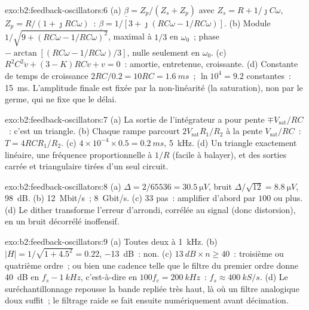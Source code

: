 \begin{solution}{exo:b2:feedback-oscillators:6}
(a) $\underline\beta = Z_p/(Z_s + Z_p)$ avec $Z_s = R + 1/\jmath C\omega$, $Z_p = R/(1 +
\jmath RC\omega)$~: $\underline\beta = 1/[3 + \jmath(RC\omega - 1/RC\omega)]$. (b) Module
$1/\sqrt{9 + (RC\omega - 1/RC\omega)^2}$, maximal à $1/3$ en $\omega_0$~; phase $-\arctan
[(RC\omega - 1/RC\omega)/3]$, nulle seulement en $\omega_0$. (c) $R^2C^2\ddot v + (3 - K)RC
\dot v + v = 0$~: amortie, entretenue, croissante. (d) Constante de temps de croissance
$2RC/0.2 = 10RC = \qty{1.6}{ms}$~; $\ln10^4 = 9.2$ constantes~: \qty{15}{ms}. L'amplitude
finale est fixée par la non-linéarité (la saturation), non par le
germe, qui ne fixe que le délai.
\end{solution}

\begin{solution}{exo:b2:feedback-oscillators:7}
(a) La sortie de l'intégrateur a pour pente $\mp V_{\text{sat}}/RC$~: c'est un triangle. (b)
Chaque rampe parcourt $2V_{\text{sat}}R_1/R_2$ à la pente $V_{\text{sat}}/RC$~: $T = 4RCR_1/R_2$.
(c) $4 \times 10^{-4} \times 0.5 = \qty{0.2}{ms}$, \qty{5}{kHz}. (d) Un triangle exactement
linéaire, une fréquence proportionnelle à $1/R$ (facile à balayer), et des sorties carrée et
triangulaire tirées d'un seul circuit.
\end{solution}

\begin{solution}{exo:b2:feedback-oscillators:8}
(a) $\Delta = 2/65536 = \qty{30.5}{\micro V}$, bruit $\Delta/\sqrt{12} = \qty{8.8}{\micro V}$,
\qty{98}{dB}. (b) \qty{12}{Mbit/s}~; \qty{8}{Gbit/s}. (c) $33$ pas~: amplifier d'abord
par $100$ ou plus. (d) Le dither transforme l'erreur d'arrondi, corrélée
au signal (donc distorsion), en un bruit décorrélé inoffensif.
\end{solution}

\begin{solution}{exo:b2:feedback-oscillators:9}
(a) Toutes deux à \qty{1}{kHz}. (b) $|H| = 1/\sqrt{1 + 4.5^2} = 0.22$, \qty{-13}{dB}~: non. (c)
$\qty{13}{dB} \times n \ge 40$~: troisième ou quatrième ordre~; ou bien une cadence telle
que le filtre du premier ordre donne \qty{40}{dB} en $f_s - \qty{1}{kHz}$, c'est-à-dire en
$100f_c = \qty{200}{kHz}$~: $f_s \approx \qty{400}{kS/s}$. (d) Le suréchantillonnage repousse la
bande repliée très haut, là où un filtre analogique doux suffit~; le filtrage
raide se fait ensuite numériquement avant décimation.
\end{solution}

